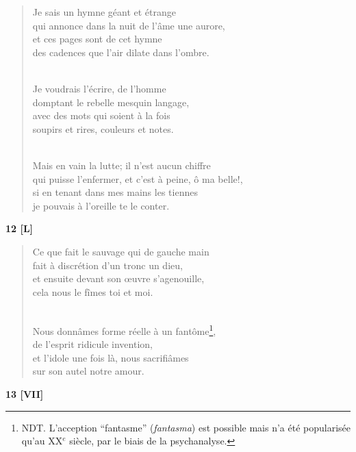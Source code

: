 \documentclass[a4paper,11pt]{book}
\begin{document}
\begin{verse}
Je sais un hymne géant et étrange \\
qui annonce dans la nuit de l'âme une aurore, \\
et ces pages sont de cet hymne \\
des cadences que l'air dilate dans l'ombre. \\ \

Je voudrais l'écrire, de l'homme \\
domptant le rebelle mesquin langage, \\
avec des mots qui soient à la fois \\
soupirs et rires, couleurs et notes. \\ \

Mais en vain la lutte; il n'est aucun chiffre \\
qui puisse l'enfermer, et c'est à peine, ô ma belle!, \\
si en tenant dans mes mains les tiennes \\
je pouvais à l'oreille te le conter. \\
\end{verse}

\bigskip

\begin{center} {\bf 12 [L]} \end{center}

\begin{verse}
Ce que fait le sauvage qui de gauche main \\
fait à discrétion d'un tronc un dieu, \\
et ensuite devant son {\oe}uvre s'agenouille, \\
cela nous le fîmes toi et moi. \\ \

Nous donnâmes forme réelle à un fantôme\footnote{NDT. L'acception ``fantasme'' ({\em fantasma}) est possible mais n'a été popularisée qu'au XX$^e$ siècle, par le biais de la psychanalyse.}, \\
de l'esprit ridicule invention, \\
et l'idole une fois là, nous sacrifiâmes \\
sur son autel notre amour. \\
\end{verse}


\begin{center} {\bf 13 [VII]} \end{center}
\end{document}
